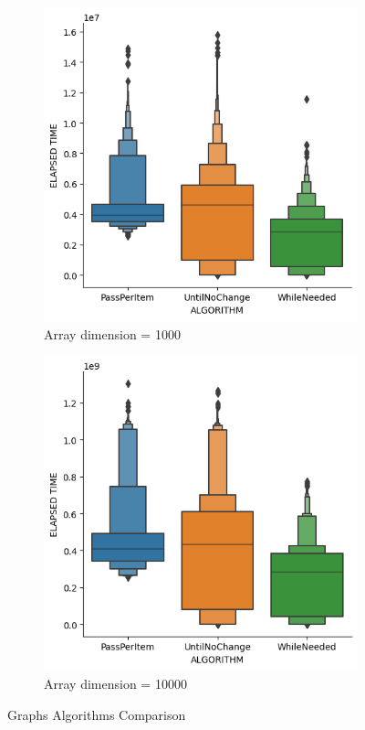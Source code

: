 \documentclass{article}
\begin{document}
\begin{figure}[H]
    \centering
    \begin{subfigure}[b]{0.48\textwidth}
        \centering
        \includegraphics[width=\textwidth]{./data/comparison_algorithm_1000.png}
        \caption{Array dimension = 1000}
    \end{subfigure}
    \hfill
    \begin{subfigure}[b]{0.48\textwidth}
        \centering
        \includegraphics[width=\textwidth]{./data/comparison_algorithm_10000.png}
        \caption{Array dimension = 10000}
    \end{subfigure}
    \caption{Graphs Algorithms Comparison}
\end{figure}
\end{document}
